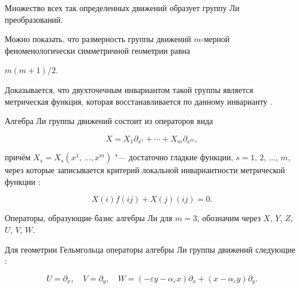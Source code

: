 Множество всех так определенных движений образует группу Ли преобразований. 

Можно показать, что размерность группы движений $m$-мерной феноменологически симметричной геометрии  равна

$m(m+1)/2$. 

Доказывается, что двухточечным инвариантом такой группы является метрическая функция, которая восстанавливается по данному инварианту \cite{kyrov:bib3}.



Алгебра Ли группы движений состоит из операторов вида

\begin{equation}

\label{kyrov:1.1}

X = X_1\partial_{x^1}+ \cdots +

X_m\partial_{x^m},

\end{equation}

причём $X_s =X_s(x^1,\,\ldots,x^m)$ "--- достаточно гладкие функции, $s = 1,\, 2, \,\ldots,\,m$, через которые записывается критерий локальной инвариантности метрической функции \cite[c.~35]{kyrov:bib4}:

\begin{equation}

\label{kyrov:1.2}

 X(i)f(ij) + X(j)(ij) = 0.

 \end{equation}

Операторы, образующие базис алгебры Ли для $m=3$, обозначим через $X$, $Y$, $Z$, $U$, $V$, $W$. 

Для геометрии Гельмгольца операторы алгебры Ли группы движений следующие \cite{kyrov:bib1,kyrov:bib5}:

\begin{equation}

\label{kyrov:1.45}

U = \partial_x,\quad V = \partial_y,\quad W = (-\varepsilon y - \alpha_{\varepsilon}x)\partial_x + (x -

\alpha_{\varepsilon}y)\partial_y.

\end{equation}



\pagebreak






